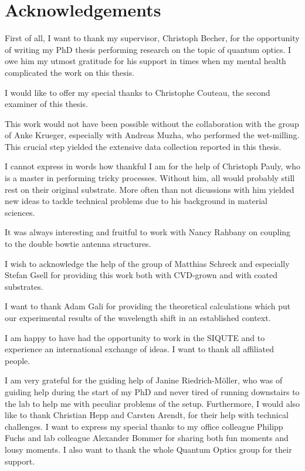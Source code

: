

\null\vfill
\section*{Acknowledgements}
	
	First of all, I want to thank my supervisor, Christoph Becher, for the opportunity of writing my PhD thesis performing research on the topic of quantum optics. 
	I owe him my utmost gratitude for his support in times when my mental health complicated the work on this thesis.

	I would like to offer my special thanks to Christophe Couteau, the second examiner of this thesis. 

	This work would not have been possible without the collaboration with the group of Anke Krueger, especially with Andreas Muzha, who performed the wet-milling. 
	This crucial step yielded the extensive data collection reported in this thesis.

	I cannot express in words how thankful I am for the help of Christoph Pauly, who is a master in performing tricky \pp processes. Without him, all \nds would probably still rest on their original substrate. 
	More often than not dicussions with him yielded new ideas to tackle technical problems due to his background in material sciences.

	It was always interesting and fruitful to work with Nancy Rahbany on coupling \nds to the double bowtie antenna structures. 

	I wish to acknowledge the help of the group of Matthias Schreck and especially Stefan Gsell for providing this work both with CVD-grown \nds and with \ir coated substrates.

	I want to thank Adam Gali for providing the theoretical calculations which put our experimental results of the wavelength shift in an established context.

	I am happy to have had the opportunity to work in the SIQUTE and to experience an international exchange of ideas. I want to thank all affiliated people.

	I am very grateful for the guiding help of Janine Riedrich-Möller, who was of guiding help during the start of my PhD and never tired of running downstairs to the lab to help me with peculiar problems of the setup. 
	Furthermore, I would also like to thank Christian Hepp and Carsten Arendt, for their help with technical challenges. 
	I want to express my special thanks to my office colleague Philipp Fuchs and lab colleague Alexander Bommer for sharing both fun moments and lousy moments.
	I also want to thank the whole Quantum Optics group for their support.

